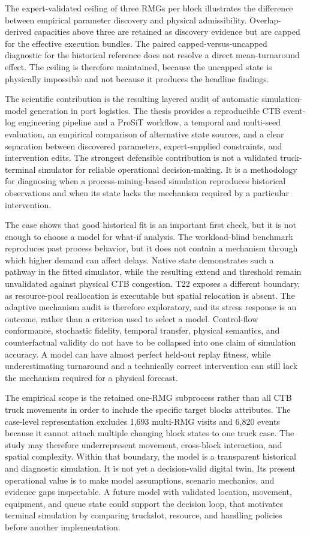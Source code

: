 The expert-validated ceiling of three RMGs per block illustrates the
difference between empirical parameter discovery and physical admissibility.
Overlap-derived capacities above three are retained as discovery evidence but
are capped for the effective execution bundles. The paired capped-versus-uncapped
diagnostic for the historical reference does not resolve a direct
mean-turnaround effect. The ceiling is therefore maintained, because the uncapped
state is physically impossible and not because it produces the headline findings.

The scientific contribution is the resulting layered audit of automatic
simulation-model generation in port logistics. The thesis provides a
reproducible CTB event-log engineering pipeline and a ProSiT workflow, a temporal and multi-seed
evaluation, an empirical comparison of alternative state sources, and a clear
separation between discovered parameters, expert-supplied constraints, and
intervention edits. The strongest defensible contribution is not a validated
truck-terminal simulator for reliable operational decision-making. It is a
methodology for diagnosing when a process-mining-based simulation reproduces
historical observations and when its state lacks the mechanism required by a
particular intervention.

The case shows that good historical fit is an important first check, but it is not enough to choose a model for what-if analysis. The workload-blind benchmark reproduces past process behavior, but it does not contain a mechanism through which higher demand can affect delays. Native state demonstrates such a pathway in the fitted
simulator, while the resulting extend and threshold remain unvalidated
against physical CTB congestion. T22 exposes a different boundary, as
resource-pool reallocation is executable but spatial relocation is absent. The
adaptive mechanism audit is therefore exploratory, and its stress response is
an outcome, rather than a criterion used to select a model. Control-flow
conformance, stochastic fidelity, temporal transfer, physical semantics, and
counterfactual validity do not have to be collapsed into one claim of simulation
accuracy. A model can have almost perfect held-out replay fitness, while
underestimating turnaround and a technically correct intervention can still
lack the mechanism required for a physical forecast.

The empirical scope is the retained one-RMG subprocess rather than all CTB
truck movements in order to include the specific target blocks attributes. The case-level representation excludes 1,693 multi-RMG visits
and 6,820 events because it cannot attach multiple changing block states to one
truck case. The study may therefore underrepresent movement, cross-block
interaction, and spatial complexity. Within that boundary, the model is a
transparent historical and diagnostic simulation. It is not yet a
decision-valid digital twin. Its present operational value is to make model
assumptions, scenario mechanics, and evidence gaps inspectable. A future model
with validated location, movement, equipment, and queue state could support the
decision loop, that motivates terminal simulation by comparing truckslot,
resource, and handling policies before another implementation.

